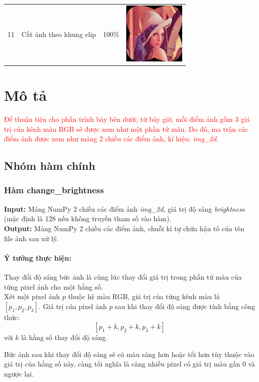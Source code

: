 \documentclass[]{article}
\begin{document}
\begin{longtable}[c]{|r|l|c|l|}
  11 & Cắt ảnh theo khung elip & 100\% & \parbox[c]{8em}{\includegraphics[width=8em]{image/Lenna_elliptical_crop.png}} \\ \hline
\end{longtable}

\section{Mô tả}
\textcolor{red}{Để thuận tiện cho phần trình bày bên dưới, từ bây giờ, mỗi điểm ảnh gồm 3 giá trị của kênh màu RGB sẽ được xem như một phần tử màu. Do đó, ma trận các điểm ảnh được xem như mảng 2 chiều các điểm ảnh, kí hiệu: \textit{img\_2d}. }
\subsection{Nhóm hàm chính}
\subsubsection{Hàm change\_brightness}
\textbf{Input:} Mảng NumPy 2 chiều các điểm ảnh \textit{img\_2d}, giá trị độ sáng \textit{brightness} (mặc định là 128 nếu không truyền tham số vào hàm). \\
\textbf{Output:} Mảng NumPy 2 chiều các điểm ảnh, chuỗi kí tự chứa hậu tố của tên file ảnh sau xử lý.

\paragraph{Ý tưởng thực hiện:} Thay đổi độ sáng bức ảnh là cùng lúc thay đổi giá trị trong phần tử màu của từng pixel ảnh cho một hằng số. \\
Xét một pixel ảnh $p$ thuộc hệ màu RGB, giá trị của từng kênh màu là $[p_{1}, p_{2}, p_{3}]$. Giá trị của pixel ảnh $p$ sau khi thay đổi độ sáng được tính bằng công thức: 
\[[p_{1} + k , p_{2} + k, p_{3} + k]\]
với $k$ là hằng số thay đổi độ sáng. \par Bức ảnh sau khi thay đổi độ sáng sẽ có màu sáng hơn hoặc tối hơn tùy thuộc vào giá trị của hằng số này, càng tối nghĩa là càng nhiều pixel có giá trị màu gần 0 và ngược lại.
\end{document}
